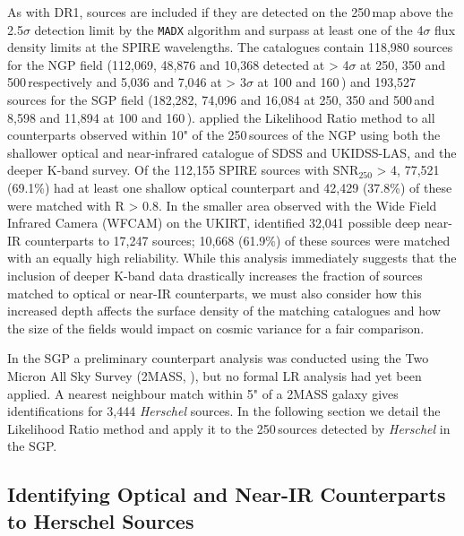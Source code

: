 As with DR1, sources are included if they are detected on the 250\,\micron map above the 2.5$\sigma$ detection limit by the \texttt{MADX} algorithm and surpass at least one of the 4$\sigma$ flux density limits at the SPIRE wavelengths. The catalogues contain 118,980 sources for the NGP field (112,069, 48,876 and 10,368 detected at > 4$\sigma$ at 250, 350 and 500\,\micron respectively and 5,036 and 7,046 at > 3$\sigma$ at 100 and 160\,\micron) and 193,527 sources for the SGP field (182,282, 74,096 and 16,084 at 250, 350 and 500\,\micron and 8,598 and 11,894 at 100 and 160\,\micron). \citealt{Furlanetto_2018} applied the Likelihood Ratio method to all counterparts observed within 10" of the 250\,\micron sources of the NGP using both the shallower optical and near-infrared catalogue of SDSS and UKIDSS-LAS, and the deeper K-band survey. Of the 112,155 SPIRE sources with SNR$_{250}$ > 4, 77,521 (69.1\%) had at least one shallow optical counterpart and 42,429 (37.8\%) of these were matched with R > 0.8. In the smaller area observed with the Wide Field Infrared Camera (WFCAM) on the UKIRT, \citealt{Furlanetto_2018} identified 32,041 possible deep near-IR counterparts to 17,247 sources; 10,668 (61.9\%) of these sources were matched with an equally high reliability. While this analysis immediately suggests that the inclusion of deeper K-band data drastically increases the fraction of sources matched to optical or near-IR counterparts, we must also consider how this increased depth affects the surface density of the matching catalogues and how the size of the fields would impact on cosmic variance for a fair comparison.

In the SGP a preliminary counterpart analysis was conducted using the Two Micron All Sky Survey (2MASS, \citealt{Skrutskie_2006}), but no formal LR analysis had yet been applied. A nearest neighbour match within 5" of a 2MASS galaxy gives identifications for 3,444 \textit{Herschel} sources. In the following section we detail the Likelihood Ratio method and apply it to the 250\,\micron sources detected by \textit{Herschel} in the SGP.

\subsection{Identifying Optical and Near-IR Counterparts to Herschel Sources}
\label{sec:Identifying Optical and Near-IR Counterparts to Herschel Sources}

